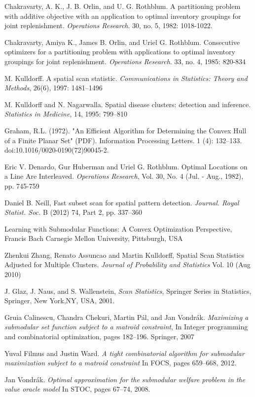 \documentclass{article}
\theoremstyle{case}
\begin{document}
\begin{thebibliography}{1}

    Chakravarty, A. K., J. B. Orlin, and U. G. Rothblum. A partitioning problem with additive objective with an application to optimal inventory groupings for joint replenishment. {\em Operations Research}. 30, no. 5, 1982: 1018-1022.

     Chakravarty, Amiya K., James B. Orlin, and Uriel G. Rothblum. Consecutive optimizers for a partitioning problem with applications to optimal inventory groupings for joint replenishment. {\em Operations Research}. 33, no. 4, 1985: 820-834

	 M. Kulldorff. A spatial scan statistic. {\em Communications in Statistics: Theory and Methods}, 26(6), 1997: 1481–1496

	 M. Kulldorff and N. Nagarwalla. Spatial disease clusters: detection and inference. {\em Statistics in Medicine}, 14, 1995: 799–810
	
	 Graham, R.L. (1972). "An Efficient Algorithm for Determining the Convex Hull of a Finite Planar Set" (PDF). Information Processing Letters. 1 (4): 132–133. doi:10.1016/0020-0190(72)90045-2.	
	
	 Eric V. Denardo, Gur Huberman and Uriel G. Rothblum. Optimal Locations on a Line Are Interleaved. {\em Operations Research}, Vol. 30, No. 4 (Jul. - Aug., 1982), pp. 745-759

	 Daniel B. Neill, Fast subset scan for spatial pattern detection. {\em Journal. Royal Statist. Soc.} B (2012) 74, Part 2, pp. 337–360
	
	 Learning with Submodular Functions: A Convex Optimization Perspective, Francis Bach Carnegie Mellon University, Pittsburgh, USA
	
	 Zhenkui Zhang, Renato Assuncao and Martin Kulldorff, Spatial Scan Statistics Adjusted for Multiple Clusters. {\em Journal of Probability and Statistics} Vol. 10 (Aug 2010)
	
	 J. Glaz, J. Naus, and S. Wallenstein, {\em Scan Statistics}, Springer Series in Statistics, Springer, New York,NY, USA, 2001.
	
	 Gruia Calinescu, Chandra Chekuri, Martin Pál, and Jan Vondrák. {\em Maximizing a submodular set function subject to a matroid constraint}, In Integer programming and combinatorial optimization, pages 182–196. Springer, 2007
	
	 Yuval Filmus and Justin Ward. {\em A tight combinatorial algorithm for submodular maximization subject to a matroid constraint} In FOCS, pages 659–668, 2012.
	
	 Jan Vondrák. {\em Optimal approximation for the submodular welfare problem in the value oracle model} In STOC, pages 67–74, 2008.	

\end{thebibliography}
\end{document}
